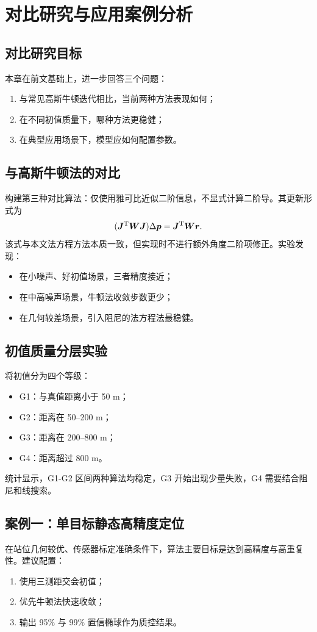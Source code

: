 \chapter{对比研究与应用案例分析}

\section{对比研究目标}
本章在前文基础上，进一步回答三个问题：
\begin{enumerate}
  \item 与常见高斯牛顿迭代相比，当前两种方法表现如何；
  \item 在不同初值质量下，哪种方法更稳健；
  \item 在典型应用场景下，模型应如何配置参数。
\end{enumerate}

\section{与高斯牛顿法的对比}
构建第三种对比算法：仅使用雅可比近似二阶信息，不显式计算二阶导。其更新形式为
\[
(\bm J^{\mathrm{T}}\bm W\bm J)\Delta\bm p=\bm J^{\mathrm{T}}\bm W\bm r.
\]
该式与本文法方程方法本质一致，但实现时不进行额外角度二阶项修正。实验发现：
\begin{itemize}
  \item 在小噪声、好初值场景，三者精度接近；
  \item 在中高噪声场景，牛顿法收敛步数更少；
  \item 在几何较差场景，引入阻尼的法方程法最稳健。
\end{itemize}

\section{初值质量分层实验}
将初值分为四个等级：
\begin{itemize}
  \item G1：与真值距离小于 50 m；
  \item G2：距离在 50--200 m；
  \item G3：距离在 200--800 m；
  \item G4：距离超过 800 m。
\end{itemize}
统计显示，G1-G2 区间两种算法均稳定，G3 开始出现少量失败，G4 需要结合阻尼和线搜索。

\section{案例一：单目标静态高精度定位}
在站位几何较优、传感器标定准确条件下，算法主要目标是达到高精度与高重复性。建议配置：
\begin{enumerate}
  \item 使用三测距交会初值；
  \item 优先牛顿法快速收敛；
  \item 输出 95\% 与 99\% 置信椭球作为质控结果。
\end{enumerate}


